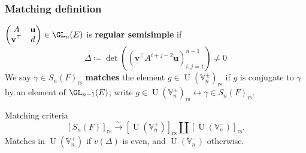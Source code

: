 \documentclass[11pt]{beamer}
\DeclareMathOperator{\Orb}{Orb}
\DeclareMathOperator{\U}{U}
\newcommand{\HH}{\mathcal{H}}
\newcommand{\VV}{\mathbb{V}}
\newcommand{\rs}{_{\text{rs}}}
\newcommand{\uu}{\mathbf{u}}
\newcommand{\vv}{\mathbf{v}}
\begin{document}
\begin{frame}
  \frametitle{Matching definition}
  \begin{definition}
  $\begin{pmatrix} A & \uu \\ \vv^\top & d \end{pmatrix} \in \GL_n(E)$
  is \textbf{regular semisimple} if
  \[ \Delta \coloneqq \det \left( \left( \vv^\top A^{i+j-2} \uu \right)_{i,j=1}^{n-1} \right) \neq 0 \]
  We say $\gamma \in S_n(F)\rs$ \textbf{matches} the element $g \in \U(\VV_n^\pm)\rs$
  if $g$ is conjugate to $\gamma$ by an element of $\GL_{n-1}(E)$; write
  $g \in \U(\VV_n^\pm)\rs \longleftrightarrow \gamma \in S_n(F)\rs$.
  \end{definition}
  \begin{block}{Matching criteria}
    \[ [S_n(F)]\rs \xrightarrow{\sim} [\U(\VV_n^+)]\rs \amalg [\U(\VV_n^-)]\rs. \]
    Matches in $\U(\VV_n^+)$ if $v(\Delta)$ is even,
    and $\U(\VV_n^-)$ otherwise.
  \end{block}
\end{frame}

\end{document}

